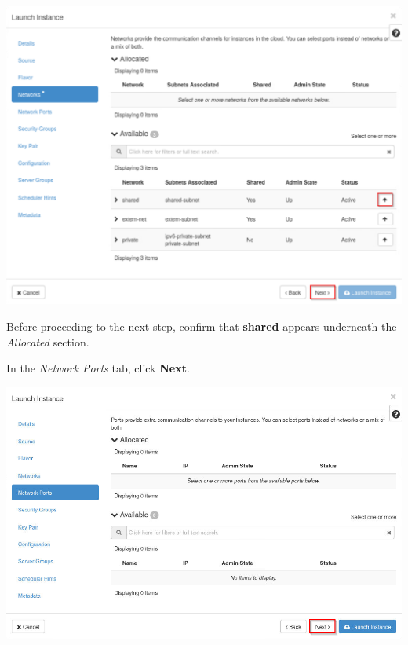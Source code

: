 \documentclass[letterpaper, 12pt]{article}
\begin{document}
\begin{enumerate}
\begin{labstep}
        \begin{center}
            \includegraphics[width=\linewidth]{images/part2/step6.png}
        \end{center}
    \end{labstep}

    \begin{stopbox}
        Before proceeding to the next step, confirm that \textbf{shared} appears underneath the \textit{Allocated} section.
    \end{stopbox}

    \begin{labstep}
        In the \textit{Network Ports} tab, click \textbf{Next}.

        \begin{center}
            \includegraphics[width=\linewidth]{images/part2/step7.png}
        \end{center}
    \end{labstep}


\end{enumerate}
\end{document}
